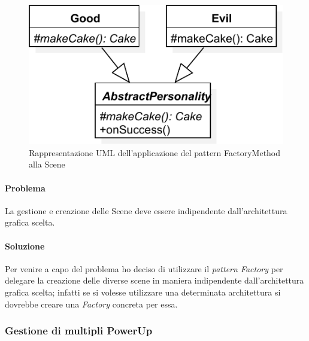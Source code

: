 \documentclass[a4paper,12pt]{report}
\begin{document}
\begin{figure}[H]
\centering{}
\includegraphics[width=\textwidth]{img/template}
\caption{Rappresentazione UML dell'applicazione del pattern FactoryMethod alla Scene}
\label{img:template}
\end{figure}

\paragraph{Problema} La gestione e creazione delle Scene deve essere indipendente dall'architettura grafica scelta.

\paragraph{Soluzione} Per venire a capo del problema ho deciso di utilizzare il \textit{pattern Factory} per delegare la creazione delle diverse scene in maniera indipendente dall'architettura grafica scelta; infatti se si volesse utilizzare una determinata architettura si dovrebbe creare una \textit{Factory} concreta per essa.

\subsubsection{Gestione di multipli PowerUp}
\end{document}
